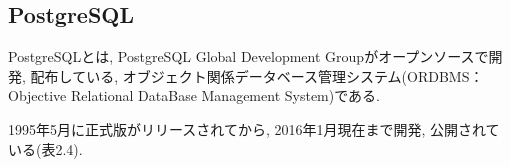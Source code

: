 \begin{description}
\begin{itemize}
\end{itemize}

\end{description}

\subsection{PostgreSQL}
PostgreSQLとは, PostgreSQL Global Development Groupがオープンソースで開発, 配布している, オブジェクト関係データベース管理システム(ORDBMS：Objective Relational DataBase Management System)である.

1995年5月に正式版がリリースされてから, 2016年1月現在まで開発, 公開されている(表2.4).

